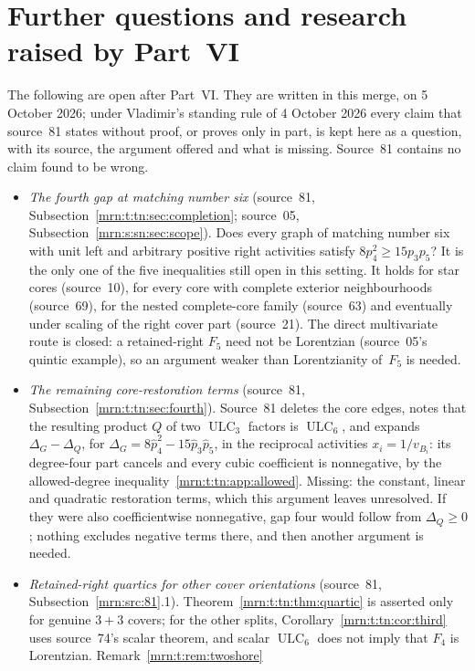\documentclass[11pt,a4paper]{article}
\theoremstyle{remark}\newtheorem{remark}[theorem]{Remark}
\newcommand{\ULC}{\operatorname{ULC}}      %
\begin{document}
\section{Further questions and research raised by Part~VI}\label{mrn:t:sec:questions}
The following are open after Part~VI. They are written in this merge, on
5 October 2026; under Vladimir's standing rule of 4 October 2026 every claim
that source~81 states without proof, or proves only in part, is kept here as
a question, with its source, the argument offered and what is missing.
Source~81 contains no claim found to be wrong.
\begin{itemize}
\item \emph{The fourth gap at matching number six} (source~81,
  Subsection~\ref{mrn:t:tn:sec:completion}; source~05,
  Subsection~\ref{mrn:s:sn:sec:scope}). Does every graph of matching number
  six with unit left and arbitrary positive right activities satisfy
  $8p_4^2\ge15p_3p_5$? It is the only one of the five inequalities still
  open in this setting. It holds for star cores (source~10), for every core
  with complete exterior neighbourhoods (source~69), for the nested
  complete-core family (source~63) and eventually under scaling of the right
  cover part (source~21). The direct multivariate route is closed: a
  retained-right $F_5$ need not be Lorentzian (source~05's quintic example),
  so an argument weaker than Lorentzianity of~$F_5$ is needed.
\item \emph{The remaining core-restoration terms} (source~81,
  Subsection~\ref{mrn:t:tn:sec:fourth}). Source~81 deletes the core edges,
  notes that the resulting product $Q$ of two $\ULC_3$ factors is $\ULC_6$,
  and expands $\Delta_G-\Delta_Q$, for
  $\Delta_G=8\widehat p_4^2-15\widehat p_3\widehat p_5$, in the reciprocal
  activities $x_i=1/v_{B_i}$: its degree-four part cancels and every cubic
  coefficient is nonnegative, by the allowed-degree
  inequality~\eqref{mrn:t:tn:app:allowed}. Missing: the constant, linear and
  quadratic restoration terms, which this argument leaves unresolved. If they
  were also coefficientwise nonnegative, gap four would follow from
  $\Delta_Q\ge0$; nothing excludes negative terms there, and then another
  argument is needed.
\item \emph{Retained-right quartics for other cover orientations}
  (source~81, Subsection~\ref{mrn:src:81}.1). Theorem~\ref{mrn:t:tn:thm:quartic}
  is asserted only for genuine $3+3$ covers; for the other splits,
  Corollary~\ref{mrn:t:tn:cor:third} uses source~74's scalar theorem, and
  scalar $\ULC_6$ does not imply that $F_4$ is Lorentzian. Remark~\ref{mrn:t:rem:twoshore}

\end{itemize}
\end{document}
